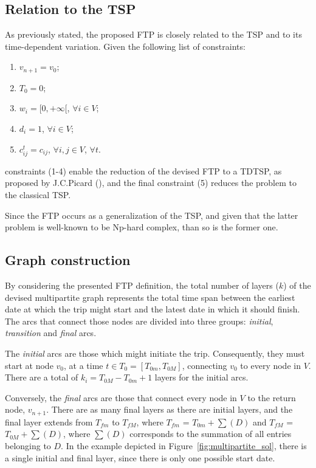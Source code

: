\documentclass[onecolumn]{elsarticle}
\begin{document}
\subsection{Relation to the TSP}

As previously stated, the proposed FTP is closely related to the TSP and to its time-dependent variation. Given the following list of constraints:
\begin{enumerate}
      \item $v_{n+1} = v_0$;
      \item $T_0 = 0$;
      \item $w_i = [0, +\infty[$, $\forall i \in V$;
      \item $d_i = 1$, $\forall i \in V$;
    \item $c_{ij}^{t} = c_{ij}$, $\forall i, j \in V$, $\forall t$.
\end{enumerate}
constraints (1-4) enable the reduction of the devised FTP to a TDTSP, as proposed by J.C.Picard (\cite{tdtsp_picard}), and the final constraint (5) reduces the problem to the classical TSP.

Since the FTP occurs as a generalization of the TSP, and given that the latter problem is well-known to be Np-hard complex, than so is the former one.


\subsection{Graph construction}
\label{sec:graph}

By considering the presented FTP definition, the total number of layers ($k$) of the devised multipartite graph represents the total time span between the earliest date at which the trip might start and the latest date in which it should finish. The arcs that connect those nodes are divided into three groups: \textit{initial}, \textit{transition} and \textit{final} arcs.

The \textit{initial} arcs are those which might initiate the trip. Consequently, they must start at node $v_0$, at a time $t \in T_0 = [T_{0m}, T_{0M}]$, connecting $v_0$ to every node in $V$. There are a total of $k_i = T_{0M} - T_{0m} + 1$ layers for the initial arcs.

Conversely, the \textit{final} arcs are those that connect every node in $V$ to the return node, $v_{n+1}$. There are as many final layers as there are initial layers, and the final layer extends from $T_{fm}$ to $T_{fM}$, where $T_{fm}$ = $T_{0m} + \sum(D)$ and $T_{fM}$ = $T_{0M} + \sum(D)$, where $\sum(D)$ corresponds to the summation of all entries belonging to $D$. In the example depicted in Figure~\ref{fig:multipartite_sol}, there is a single initial and final layer, since there is only one possible start date.
\end{document}
